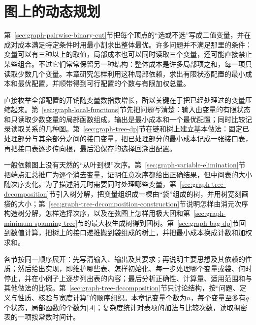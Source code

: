 \chapter{图上的动态规划}
\label{chap:graph-dynamic-programming}

第~\ref{sec:graph-pairwise-binary-cut}节把每个顶点的“选或不选”写成二值变量，并在成对成本满足特定条件时用最小割求出整体最优。许多问题并不满足那里的条件：变量可以有三种以上的取值，局部成本也可以同时读取三个变量，还可能直接禁止某些组合。不过它们常常保留另一种结构：整体成本是许多局部项之和，每一项只读取少数几个变量。本章研究怎样利用这种局部依赖，求出有限状态配置的最小成本和最优配置，并顺带得到可行配置的个数与有限加权总量。

直接枚举全部配置的开销随变量数指数增长，所以关键在于把已经处理过的变量压缩起来。第~\ref{sec:graph-local-functions}节先把问题写清楚：输入由变量的有限状态和只读取少数变量的局部函数组成，输出是最小成本和一个最优配置；同时比较记录读取关系的几种图。第~\ref{sec:graph-tree-dp}节在链和树上建立基本做法：固定已处理部分与其余部分之间的接口变量，把已处理部分的最小成本记成一张接口表，再把接口表逐步传向根，最后沿保存的选择回溯出配置。

一般依赖图上没有天然的“从叶到根”次序。第~\ref{sec:graph-variable-elimination}节把端点汇总推广为逐个消去变量，证明任意次序都给出正确结果，但中间表的大小随次序变化。为了描述消元时需要同时处理哪些变量，第~\ref{sec:graph-tree-decomposition}节引入树分解，把变量组织成一棵由“袋”组成的树，并用树宽刻画袋的大小；第~\ref{sec:graph-tree-decomposition-construction}节说明怎样由消元次序构造树分解，怎样选择次序，以及在弦图上怎样用极大团和第~\ref{sec:graph-minimum-spanning-tree}节的最大权生成树得到团树。第~\ref{sec:graph-bag-dp}节回到数值计算，把树上的接口递推搬到袋组成的树上，并把最小成本换成计数和加权求和。

各节按同一顺序展开：先写清输入、输出及其要求；再说明主要思想及其依赖的性质；然后给出实现，即维护哪些表、怎样初始化、每一步处理哪个变量或袋、何时停止，并在小例子上逐步列出表的内容；最后分析正确性、计算量、适用范围和与其他做法的比较。第~\ref{sec:graph-tree-decomposition}节只讨论结构，按“问题、定义与性质、核验与宽度计算”的顺序组织。本章记变量个数为$n$，每个变量至多有$q$个状态，局部函数的个数为$|A|$；复杂度统计对表项的加法与比较次数，读取稠密表的一项按常数时间计。








